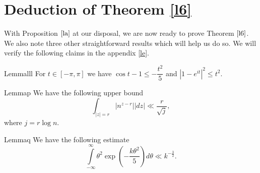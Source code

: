 \documentclass[12pt]{amsart}
\numberwithin{equation}{section}
\theoremstyle{remark}
\theoremstyle{remark}
\theoremstyle{definition}
\begin{document}
\section{Deduction of Theorem \ref{l6}}
With Proposition $\ref{la}$ at our disposal, we are now ready to prove Theorem $\ref{l6}$. We also note three other straightforward results which will help us do so. We will verify the following claims in the appendix \ref{le}.
 \begin{restatable}{Lemma}{lll}\label{l15}
 For $t\in [-\pi,\pi]$ we have $\cos t-1\leqslant -\dfrac{t^2}{5}$ and $\left|1-e^{it} \right|^2 \leqslant t^2.$
 \end{restatable}
  \begin{restatable}{Lemma}{p}\label{l16} We have the following upper bound
 $$\displaystyle\int_{|z|=r}\left|n^{z-r} \right| |dz|\ll \dfrac{r}{\sqrt{j}},$$
 where $j=r\log n.$
 \end{restatable}
 \begin{restatable}{Lemma}{q}\label{l17} We have the following estimate
$$\displaystyle\int\limits_{-\infty}^{\infty} \theta^2\exp\left( - \dfrac{k\theta^2}{5} \right)d\theta \ll k^{-\frac{3}{2}}.$$
\end{restatable}
\end{document}
